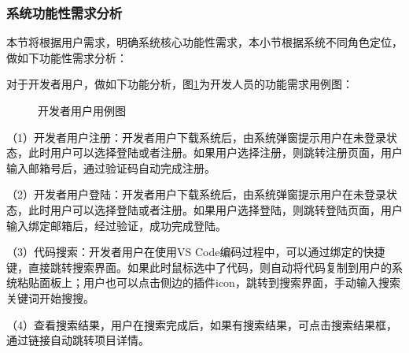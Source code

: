 \documentclass[UTF8,a4paper,12pt]{ctexart}
\numberwithin{equation}{section}
\begin{document}
\subsubsection{系统功能性需求分析}
本节将根据用户需求，明确系统核心功能性需求，本小节根据系统不同角色定位，做如下功能性需求分析：\par
对于开发者用户，做如下功能分析，图\ref{user}为开发人员的功能需求用例图：\par
\begin{figure}[H]
	\caption{开发者用户用例图}
	\label{user}
\end{figure}
（1）开发者用户注册：开发者用户下载系统后，由系统弹窗提示用户在未登录状态，此时用户可以选择登陆或者注册。如果用户选择注册，则跳转注册页面，用户输入邮箱号后，通过验证码自动完成注册。\par
（2）开发者用户登陆：开发者用户下载系统后，由系统弹窗提示用户在未登录状态，此时用户可以选择登陆或者注册。如果用户选择登陆，则跳转登陆页面，用户输入绑定邮箱后，经过验证，成功完成登陆。\par
（3）代码搜索：开发者用户在使用VS Code编码过程中，可以通过绑定的快捷键，直接跳转搜索界面。如果此时鼠标选中了代码，则自动将代码复制到用户的系统粘贴面板上；用户也可以点击侧边的插件icon，跳转到搜索界面，手动输入搜索关键词开始搜搜。\par
（4）查看搜索结果，用户在搜索完成后，如果有搜索结果，可点击搜索结果框，通过链接自动跳转项目详情。\par
\end{document}
